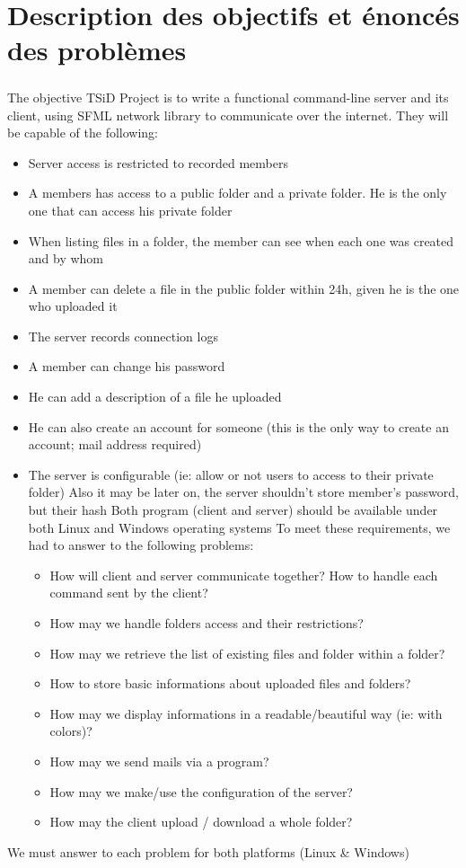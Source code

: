 \documentclass[12pt,a4paper,twoside]{article}
\begin{document}
	\section{Description des objectifs et énoncés des problèmes} %
		\subparagraph*{}
			The objective TSiD Project is to write a functional command-line server and its client, using SFML network library to communicate over the internet.
			They will be capable of the following:
			\begin{itemize}
				\item{} Server access is restricted to recorded members
				\item{} A members has access to a public folder and a private folder. He is the only one that can access his private folder
				\item{} When listing files in a folder, the member can see when each one was created and by whom
				\item{} A member can delete a file in the public folder within 24h, given he is the one who uploaded it
				\item{} The server records connection logs
				\item{} A member can change his password
				\item{} He can add a description of a file he uploaded
				\item{} He can also create an account for someone (this is the only way to create an account; mail address required)
				\item{} The server is configurable (ie: allow or not users to access to their private folder)
				Also it may be later on, the server shouldn't store member's password, but their hash
				Both program (client and server) should be available under both Linux and Windows operating systems
				To meet these requirements, we had to answer to the following problems:
				\begin{itemize}
					\item{} How will client and server communicate together? How to handle each command sent by the client?
					\item{} How may we handle folders access and their restrictions?
					\item{} How may we retrieve the list of existing files and folder within a folder?
					\item{} How to store basic informations about uploaded files and folders?
					\item{} How may we display informations in a readable/beautiful way (ie: with colors)?
					\item{} How may we send mails via a program?
					\item{} How may we make/use the configuration of the server?
					\item{} How may the client upload / download a whole folder?
				\end{itemize}
			\end{itemize}
			We must answer to each problem for both platforms (Linux \& Windows)
\end{document}
